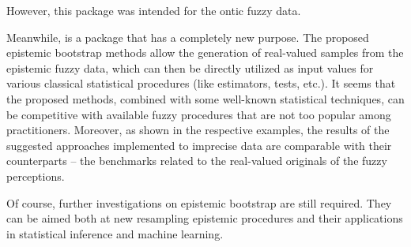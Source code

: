 However, this package was intended for the ontic fuzzy data.

Meanwhile,  is a package that has a completely new purpose. The proposed epistemic bootstrap methods allow the generation of real-valued samples from the epistemic fuzzy data, which can then be directly utilized as input values for various classical statistical procedures (like estimators, tests, etc.). It seems that the proposed methods, combined with some well-known statistical techniques, can be competitive with available fuzzy procedures that are not too popular among practitioners. Moreover, as shown in the respective examples, the results of the suggested approaches implemented to imprecise data are comparable with their counterparts -- the benchmarks related to the real-valued originals of the fuzzy perceptions.

Of course, further investigations on epistemic bootstrap are still required. They can be aimed both at new resampling epistemic procedures and their applications in statistical inference and machine learning.





\address{Maciej Romaniuk\\
    Systems Research Institute Polish Academy of Sciences\\
    Newelska 6, 01-447 Warsaw\\
    Poland\\
	WIT Academy\\
    Newelska 6, 01-447 Warsaw\\
    Poland\\
    (0000-0001-9649-396X)\\
    }

\address{Przemys{\l}aw Grzegorzewski\\
    Faculty of Mathematics and Information Science, Warsaw University of Technology \\
    Koszykowa 75, 00-662 Warsaw\\
    Poland\\
    Systems Research Institute Polish Academy of Sciences\\
    Newelska 6, 01-447 Warsaw\\
    Poland\\
    (0000-0002-5191-4123)\\
    }

\address{Abbas Parchami\\
       Department of Statistics, Faculty of Mathematics and Computer\\
       Shahid Bahonar University of Kerman, Kerman\\
       Iran\\
       (0000-0002-0593-7324)\\
       }
